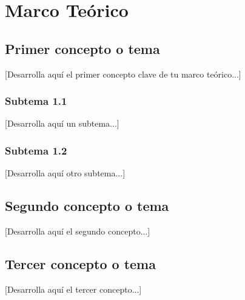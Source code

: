 %
%
%
%
%

\chapter{Marco Teórico}


\section{Primer concepto o tema}

[Desarrolla aquí el primer concepto clave de tu marco teórico...]


\subsection{Subtema 1.1}

[Desarrolla aquí un subtema...]

\subsection{Subtema 1.2}

[Desarrolla aquí otro subtema...]

\section{Segundo concepto o tema}

[Desarrolla aquí el segundo concepto...]

\section{Tercer concepto o tema}

[Desarrolla aquí el tercer concepto...]

